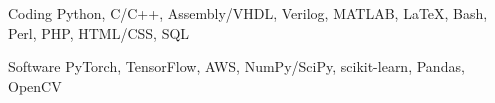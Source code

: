 

\begin{cvskills}

  \cvskill
    {Coding} %
    {Python, C/C++, Assembly/VHDL, Verilog, MATLAB\textregistered, LaTeX, Bash, Perl, PHP, HTML/CSS, SQL} %

  \cvskill
    {Software} %
    {PyTorch, TensorFlow, AWS, NumPy/SciPy, scikit-learn, Pandas, OpenCV} %
    

\end{cvskills}
